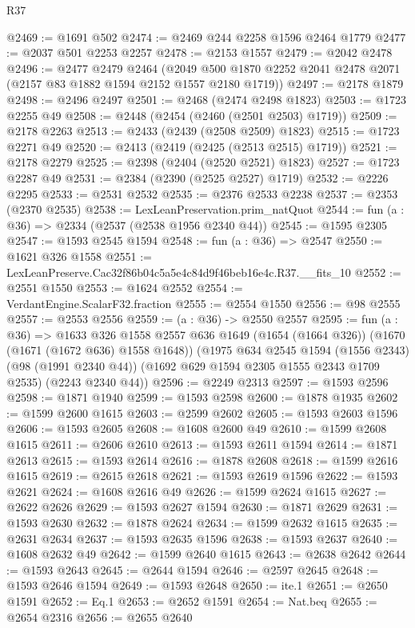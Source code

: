 \begin{lexlean}{R37}
\begin{coremodule}
@2469 := @1691 @502
@2474 := @2469 @244 @2258 @1596 @2464 @1779
@2477 := @2037 @501 @2253 @2257
@2478 := @2153 @1557
@2479 := @2042 @2478
@2496 := @2477
    @2479
    @2464
    (@2049 @500 @1870 @2252 @2041 @2478 @2071 (@2157 @83 @1882 @1594 @2152 @1557 @2180 @1719))
@2497 := @2178 @1879
@2498 := @2496 @2497
@2501 := @2468 (@2474 @2498 @1823)
@2503 := @1723 @2255 @49
@2508 := @2448 (@2454 (@2460 (@2501 @2503) @1719))
@2509 := @2178 @2263
@2513 := @2433 (@2439 (@2508 @2509) @1823)
@2515 := @1723 @2271 @49
@2520 := @2413 (@2419 (@2425 (@2513 @2515) @1719))
@2521 := @2178 @2279
@2525 := @2398 (@2404 (@2520 @2521) @1823)
@2527 := @1723 @2287 @49
@2531 := @2384 (@2390 (@2525 @2527) @1719)
@2532 := @2226 @2295
@2533 := @2531 @2532
@2535 := @2376 @2533 @2238
@2537 := @2353 (@2370 @2535)
@2538 := LexLeanPreservation.prim_natQuot
@2544 := fun (a : @36) => @2334 (@2537 (@2538 @1956 @2340 @44))
@2545 := @1595 @2305
@2547 := @1593 @2545 @1594
@2548 := fun (a : @36) => @2547
@2550 := @1621 @326 @1558
@2551 := LexLeanPreserve.Cac32f86b04c5a5e4c84d9f46beb16e4c.R37.__fits_10
@2552 := @2551 @1550
@2553 := @1624 @2552
@2554 := VerdantEngine.ScalarF32.fraction
@2555 := @2554 @1550
@2556 := @98 @2555
@2557 := @2553 @2556
@2559 := (a : @36) -> @2550 @2557
@2595 := fun (a : @36) =>
  @1633
    @326
    @1558
    @2557
    @636
    @1649
    (@1654 (@1664 @326))
    (@1670 (@1671 (@1672 @636) @1558 @1648))
    (@1975
      @634
      @2545
      @1594
      (@1556 @2343)
      (@98 (@1991 @2340 @44))
      (@1692 @629 @1594 @2305 @1555 @2343 @1709 @2535)
      (@2243 @2340 @44))
@2596 := @2249 @2313
@2597 := @1593 @2596
@2598 := @1871 @1940
@2599 := @1593 @2598
@2600 := @1878 @1935
@2602 := @1599 @2600 @1615
@2603 := @2599 @2602
@2605 := @1593 @2603 @1596
@2606 := @1593 @2605
@2608 := @1608 @2600 @49
@2610 := @1599 @2608 @1615
@2611 := @2606 @2610
@2613 := @1593 @2611 @1594
@2614 := @1871 @2613
@2615 := @1593 @2614
@2616 := @1878 @2608
@2618 := @1599 @2616 @1615
@2619 := @2615 @2618
@2621 := @1593 @2619 @1596
@2622 := @1593 @2621
@2624 := @1608 @2616 @49
@2626 := @1599 @2624 @1615
@2627 := @2622 @2626
@2629 := @1593 @2627 @1594
@2630 := @1871 @2629
@2631 := @1593 @2630
@2632 := @1878 @2624
@2634 := @1599 @2632 @1615
@2635 := @2631 @2634
@2637 := @1593 @2635 @1596
@2638 := @1593 @2637
@2640 := @1608 @2632 @49
@2642 := @1599 @2640 @1615
@2643 := @2638 @2642
@2644 := @1593 @2643
@2645 := @2644 @1594
@2646 := @2597 @2645
@2648 := @1593 @2646 @1594
@2649 := @1593 @2648
@2650 := ite.{1}
@2651 := @2650 @1591
@2652 := Eq.{1}
@2653 := @2652 @1591
@2654 := Nat.beq
@2655 := @2654 @2316
@2656 := @2655 @2640

\end{coremodule}
\end{lexlean}
